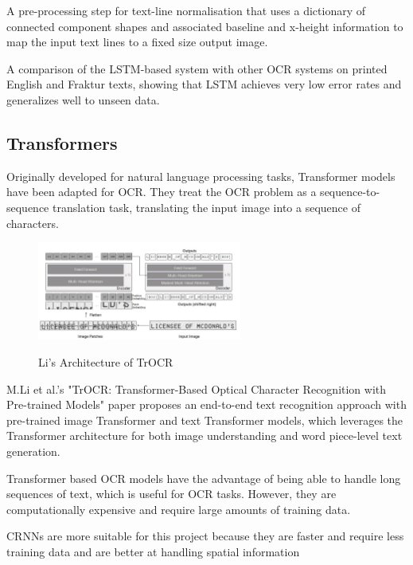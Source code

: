 A pre-processing step for text-line normalisation that uses a dictionary of connected component shapes and associated baseline and x-height information to map the input text lines to a fixed size output image.

A comparison of the LSTM-based system with other OCR systems on printed English and Fraktur texts, showing that LSTM achieves very low error rates and generalizes well to unseen data.

\newpage

\subsection{Transformers}

Originally developed for natural language processing tasks, Transformer models have been adapted for OCR. They treat the OCR problem as a sequence-to-sequence translation task, translating the input image into a sequence of characters.

\begin{figure}[ht]
    \centering
    \includegraphics[width=0.6\textwidth]{Figures/Trans_MLi.jpg}
    \caption[Li's Architecture of TrOCR]{Li's Architecture of TrOCR}\cite{liTrOCRTransformerBasedOptical2023}
    \label{fig:Li's Architecture of TrOCR}
\end{figure}

M.Li et al.'s "TrOCR: Transformer-Based Optical Character Recognition with Pre-trained Models" paper proposes an end-to-end text recognition approach with pre-trained image Transformer and text Transformer models, which leverages the Transformer architecture for both image understanding and word piece-level text generation. \cite{liTrOCRTransformerBasedOptical2023}

Transformer based OCR models have the advantage of being able to handle long sequences of text, which is useful for OCR tasks. However, they are computationally expensive and require large amounts of training data.

CRNNs are more suitable for this project because they are faster and require less training data and are better at handling spatial information

